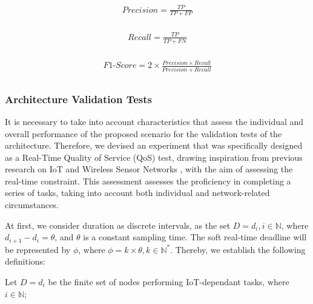 \begin{equation} \label{eq1}
\begin{split}
Precision =  \frac{TP}{TP + FP} \\
\end{split}
\end{equation}

 \begin{equation} \label{eq2}
\begin{split}
Recall =  \frac{TP }{TP +FN} \\
\end{split}
\end{equation}

\begin{equation} \label{eq3}
\begin{split}
F1\text{-}Score = 2 \times \frac{Precision \times Recall}{Precision + Recall} \\
\end{split}
\end{equation}

\subsubsection{Architecture Validation Tests}

It is necessary to take into account characteristics that assess the individual and overall performance of the proposed scenario for the validation tests of the architecture. Therefore, we devised an experiment that was specifically designed as a Real-Time Quality of Service (QoS) test, drawing inspiration from previous research on IoT and Wireless Sensor Networks \cite{silva2019analyzing,iceis21dt}, with the aim of assessing the real-time constraint. This assessment assesses the proficiency in completing a series of tasks, taking into account both individual and network-related circumstances. 

At first, we consider duration as discrete intervals, as the set $D = d_i,  i \in \mathbb{N}$, where $d_{i+1} - d_i = \theta$, and $\theta$ is a constant sampling time. The soft real-time deadline will be represented by $\phi$, where $\phi = k \times \theta, k \in \mathbb{N}^*$. Thereby, we establish the following definitions:

\begin{definition} 
    Let $D = d_i$ be the finite set of nodes performing IoT-dependant tasks, where $i \in \mathbb{N}$;
\end{definition}

